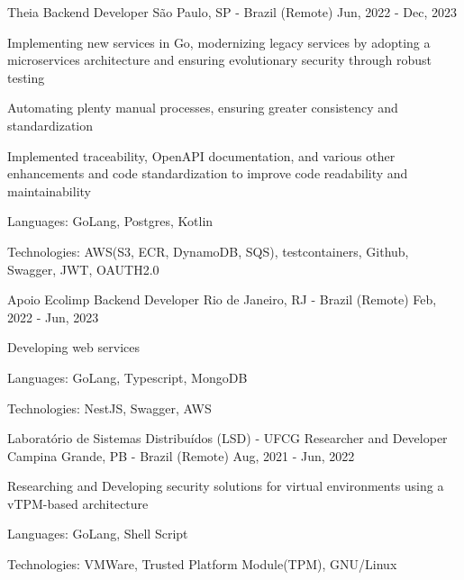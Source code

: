 
\begin{cventries}
  \cventry
  {Theia} %
  {Backend Developer} %
  {São Paulo, SP - Brazil (Remote)} %
  {Jun, 2022 - Dec, 2023} %
  {
    \begin{cvitems} %
      \item {Implementing new services in Go, modernizing legacy services by adopting a microservices architecture and ensuring evolutionary security through robust testing}
      \item {Automating plenty manual processes, ensuring greater consistency and standardization}
      \item {Implemented traceability, OpenAPI documentation, and various other enhancements and code standardization to improve code readability and maintainability}
      \item {Languages: GoLang, Postgres, Kotlin}
      \item {Technologies: AWS(S3, ECR, DynamoDB, SQS), testcontainers, Github, Swagger, JWT, OAUTH2.0}
    \end{cvitems}
  }

  \cventry
  {Apoio Ecolimp} %
  {Backend Developer} %
  {Rio de Janeiro, RJ - Brazil (Remote)} %
  {Feb, 2022 - Jun, 2023} %
  {
    \begin{cvitems} %
      \item {Developing web services}
      \item {Languages: GoLang, Typescript, MongoDB}
      \item {Technologies: NestJS, Swagger, AWS}
    \end{cvitems}
  }

  \cventry
  {Laboratório de Sistemas Distribuídos (LSD) - UFCG} %
  {Researcher and Developer} %
  {Campina Grande, PB - Brazil (Remote)} %
  {Aug, 2021 - Jun, 2022} %
  {
    \begin{cvitems} %
      \item {Researching and Developing security solutions for virtual environments using a vTPM-based architecture}
      \item {Languages: GoLang, Shell Script}
      \item {Technologies: VMWare, Trusted Platform Module(TPM), GNU/Linux}
    \end{cvitems}
  }


\end{cventries}
